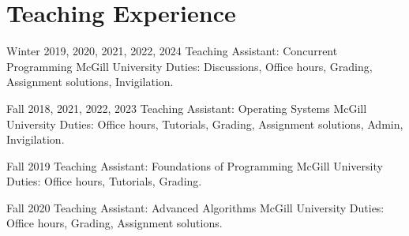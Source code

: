 
\section{Teaching Experience}


    \cventry
        {Winter 2019, 2020, 2021, 2022, 2024}
        {Teaching Assistant: Concurrent Programming}
        {McGill University}
        {}
        {}
        {Duties: Discussions, Office hours, Grading, Assignment solutions, Invigilation.}

    \cventry
        {Fall 2018, 2021, 2022, 2023}
        {Teaching Assistant: Operating Systems}
        {McGill University}
        {}
        {}
        {Duties: Office hours, Tutorials, Grading, Assignment solutions, Admin, Invigilation.}

    \cventry
        {Fall 2019}
        {Teaching Assistant: Foundations of Programming}
        {McGill University}
        {}
        {}
        {Duties: Office hours, Tutorials, Grading.}

    \cventry
        {Fall 2020}
        {Teaching Assistant: Advanced Algorithms}
        {McGill University}
        {}
        {}
        {Duties: Office hours, Grading, Assignment solutions.}